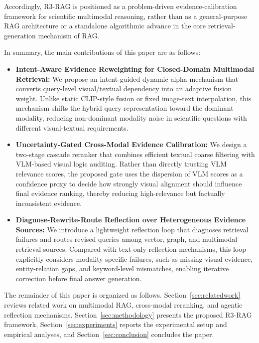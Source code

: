 \documentclass[a4paper, fleqn]{cas-dc}
\begin{document}
Accordingly, R3-RAG is positioned as a problem-driven evidence-calibration framework for scientific multimodal reasoning, rather than as a general-purpose RAG architecture or a standalone algorithmic advance in the core retrieval-generation mechanism of RAG.

In summary, the main contributions of this paper are as follows:

\begin{itemize}
    \item \textbf{Intent-Aware Evidence Reweighting for Closed-Domain Multimodal Retrieval:} We propose an intent-guided dynamic alpha mechanism that converts query-level visual/textual dependency into an adaptive fusion weight. Unlike static CLIP-style fusion or fixed image-text interpolation, this mechanism shifts the hybrid query representation toward the dominant modality, reducing non-dominant modality noise in scientific questions with different visual-textual requirements.

    \item \textbf{Uncertainty-Gated Cross-Modal Evidence Calibration:} We design a two-stage cascade reranker that combines efficient textual coarse filtering with VLM-based visual logic auditing. Rather than directly trusting VLM relevance scores, the proposed gate uses the dispersion of VLM scores as a confidence proxy to decide how strongly visual alignment should influence final evidence ranking, thereby reducing high-relevance but factually inconsistent evidence.

    \item \textbf{Diagnose-Rewrite-Route Reflection over Heterogeneous Evidence Sources:} We introduce a lightweight reflection loop that diagnoses retrieval failures and routes revised queries among vector, graph, and multimodal retrieval sources. Compared with text-only reflection mechanisms, this loop explicitly considers modality-specific failures, such as missing visual evidence, entity-relation gaps, and keyword-level mismatches, enabling iterative correction before final answer generation.
\end{itemize}

The remainder of this paper is organized as follows. Section~\ref{sec:relatedwork} reviews related work on multimodal RAG, cross-modal reranking, and agentic reflection mechanisms. Section~\ref{sec:methodology} presents the proposed R3-RAG framework, Section~\ref{sec:experiments} reports the experimental setup and empirical analyses, and Section~\ref{sec:conclusion} concludes the paper.
\end{document}
